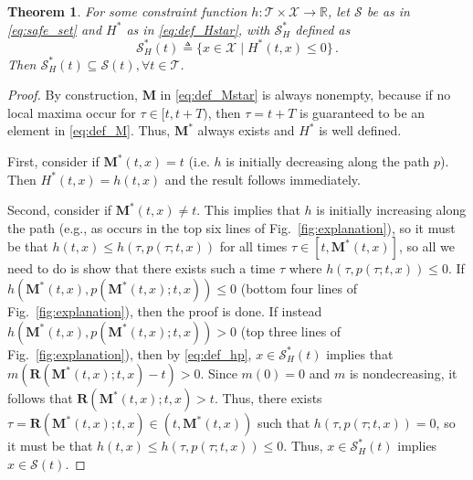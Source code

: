 \documentclass[10pt,conference]{ieeeconf}
\renewcommand{\(}{\left(}
\renewcommand{\)}{\right)}
\renewcommand{\[}{\left[}
\renewcommand{\]}{\right]}
\newcommand{\reals}{\mathbb{R}}
\newtheorem{theorem}{Theorem}
\begin{document}
\begin{theorem}%
\label{thm:subset}
For some constraint function $h:\mathcal{T}\times\mathcal{X}\rightarrow\reals$, let $\mathcal{S}$ be as in \eqref{eq:safe_set} and $H^*$ as in \eqref{eq:def_Hstar}, with $\mathcal{S}_H^*$ defined as
\begin{equation}
    \mathcal{S}_H^*(t) \triangleq \{ x \in \mathcal{X} \mid H^*(t,x) \leq 0\} \,.
\end{equation}
Then $\mathcal{S}_H^*(t)\subseteq\mathcal{S}(t), \forall t \in \mathcal{T}$.
\end{theorem}
\begin{proof}
By construction, $\boldsymbol{M}$ in \eqref{eq:def_Mstar} is always nonempty, because if no local maxima occur for $\tau \in [t,t+T)$, then $\tau = t+T$ is guaranteed to be an element in \eqref{eq:def_M}. Thus, $\boldsymbol{M}^*$ always exists and $H^*$ is well defined.

First, consider if $\boldsymbol{M}^*(t,x) = t$ (i.e. $h$ is initially decreasing along the path $p$). Then $H^*(t,x) = h(t,x)$ and the result follows immediately. 

Second, consider if $\boldsymbol{M}^*(t,x) \neq t$. This implies that $h$ is initially increasing along the path (e.g., as occurs in the top six lines of Fig.~\ref{fig:explanation}), so it must be that $h(t,x)\leq h(\tau,p(\tau;t,x))$ for all times $\tau \in [t,\boldsymbol{M}^*(t,x)]$, so all we need to do is show that there exists such a time $\tau$ where $h(\tau,p(\tau;t,x)) \leq 0$. If $h(\boldsymbol{M}^*(t,x),p(\boldsymbol{M}^*(t,x);t,x)) \leq 0$ (bottom four lines of Fig.~\ref{fig:explanation}), then the proof is done. If instead $h(\boldsymbol{M}^*(t,x),p(\boldsymbol{M}^*(t,x);t,x)) > 0$ (top three lines of Fig.~\ref{fig:explanation}), then by \eqref{eq:def_hp}, $x\in \mathcal{S}_H^*(t)$ implies that $m(\boldsymbol{R}(\boldsymbol{M}^*(t,x);t,x)-t) > 0$. Since $m(0) = 0$ and $m$  is nondecreasing, it follows that $\boldsymbol{R}(\boldsymbol{M}^*(t,x);t,x) > t$. Thus, there exists $\tau = \boldsymbol{R}(\boldsymbol{M}^*(t,x);t,x) \in (t,\boldsymbol{M}^*(t,x))$ such that $ h(\tau, p(\tau; t,x)) = 0$, so it must be that $h(t,x) \leq h(\tau, p(\tau; t,x)) \leq 0$. Thus, $x \in \mathcal{S}_H^*(t)$ implies $x \in \mathcal{S}(t)$. 
\end{proof}
\end{document}
